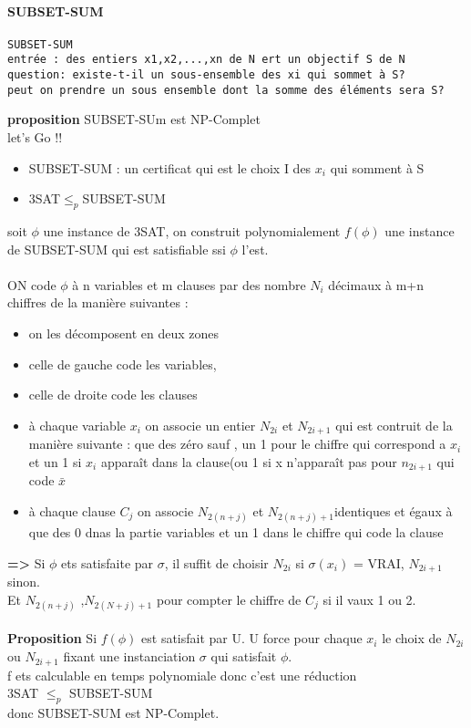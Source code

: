 \documentclass{article}
\begin{document}
\paragraph{SUBSET-SUM}
\begin{verbatim}
SUBSET-SUM
entrée : des entiers x1,x2,...,xn de N ert un objectif S de N
question: existe-t-il un sous-ensemble des xi qui sommet à S?
peut on prendre un sous ensemble dont la somme des éléments sera S?
\end{verbatim}
\textbf{proposition} SUBSET-SUm est NP-Complet\\let's Go !!
\begin{itemize}
\item SUBSET-SUM : un certificat qui est le choix I des $x_i$ qui somment à S
\item 3SAT$\leq_p$SUBSET-SUM
\end{itemize}
soit $\phi$ une instance de 3SAT, on construit polynomialement $f(\phi)$  une instance de SUBSET-SUM qui est satisfiable ssi $\phi$ l'est.\\\\ON code $\phi$ à n variables et m clauses par des nombre $N_i$ décimaux à m+n chiffres de la manière suivantes : 
\begin{itemize}
\item on les décomposent en deux zones
\item celle de gauche code les variables,
\item celle de droite code les clauses
\item à chaque variable $x_i$ on associe un entier $N_{2i}$  et $N_{2i+1}$ qui est contruit de la manière suivante : que des zéro sauf , un 1 pour le chiffre qui correspond a $x_i$ et un 1 si $x_i$ apparaît dans la clause(ou 1 si x n’apparaît pas pour $n_{2i+1}$ qui code $\bar{x}$
\item à chaque clause $C_j$ on associe $N_{2(n+j)}$ et $N_{2(n+j)+1}$identiques et égaux à que des 0 dnas la partie variables et un 1 dans le chiffre qui code la clause
\end{itemize}
\textbf{=>} Si $\phi$ ets satisfaite par $\sigma$, il suffit de choisir $N_ {2i}$ si $\sigma(x_i)$ = VRAI, $N_{2i+1}$ sinon.\\Et $N_{2(n+j)}$ ,$N_{2(N+j)+1}$ pour compter le chiffre de $C_j$ si il vaux 1 ou 2.\\\\
\textbf{Proposition} Si $f(\phi)$ est satisfait par U. U force pour chaque $x_i$ le choix de $N_{2i}$ ou $N_{2i+1}$ fixant une instanciation $\sigma$ qui satisfait $\phi$.\\f ets calculable en temps polynomiale donc c’est une réduction \\3SAT $\leq_p$ SUBSET-SUM\\donc SUBSET-SUM est NP-Complet.\\
\end{document}
